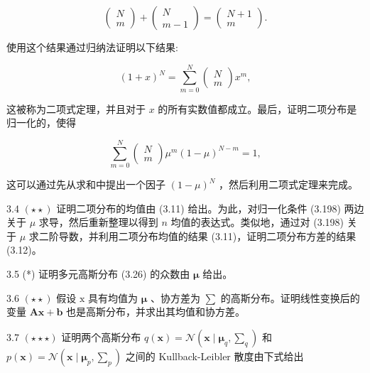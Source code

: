 \documentclass[10pt]{article}
\begin{document}
\[
\left( \begin{array}{l} N \\  m \end{array}\right)  + \left( \begin{matrix} N \\  m - 1 \end{matrix}\right)  = \left( \begin{matrix} N + 1 \\  m \end{matrix}\right) . \tag{3.196}
\]

使用这个结果通过归纳法证明以下结果:

\[
{\left( 1 + x\right) }^{N} = \mathop{\sum }\limits_{{m = 0}}^{N}\left( \begin{array}{l} N \\  m \end{array}\right) {x}^{m}, \tag{3.197}
\]

这被称为二项式定理，并且对于 \(x\) 的所有实数值都成立。最后，证明二项分布是归一化的，使得

\[
\mathop{\sum }\limits_{{m = 0}}^{N}\left( \begin{array}{l} N \\  m \end{array}\right) {\mu }^{m}{\left( 1 - \mu \right) }^{N - m} = 1, \tag{3.198}
\]

这可以通过先从求和中提出一个因子 \({\left( 1 - \mu \right) }^{N}\) ，然后利用二项式定理来完成。

3.4 \(\left( {\star  \star  }\right)\) 证明二项分布的均值由 (3.11) 给出。为此，对归一化条件 (3.198) 两边关于 \(\mu\) 求导，然后重新整理以得到 \(n\) 均值的表达式。类似地，通过对 (3.198) 关于 \(\mu\) 求二阶导数，并利用二项分布均值的结果 (3.11)，证明二项分布方差的结果 (3.12)。

3.5 (*) 证明多元高斯分布 (3.26) 的众数由 \(\mathbf{\mu }\) 给出。

3.6 \(\left( {\star  \star  }\right)\) 假设 \(\mathrm{x}\) 具有均值为 \(\mathbf{\mu }\) 、协方差为 \(\mathbf{\sum }\) 的高斯分布。证明线性变换后的变量 \(\mathbf{{Ax}} + \mathbf{b}\) 也是高斯分布，并求出其均值和协方差。

3.7 \(\left( {\star  \star   \star  }\right)\) 证明两个高斯分布 \(q\left( \mathbf{x}\right)  = \mathcal{N}\left( {\mathbf{x} \mid  {\mathbf{\mu }}_{q},{\mathbf{\sum }}_{q}}\right)\) 和 \(p\left( \mathbf{x}\right)  = \mathcal{N}\left( {\mathbf{x} \mid  {\mathbf{\mu }}_{p},{\mathbf{\sum }}_{p}}\right)\) 之间的 Kullback-Leibler 散度由下式给出
\end{document}
